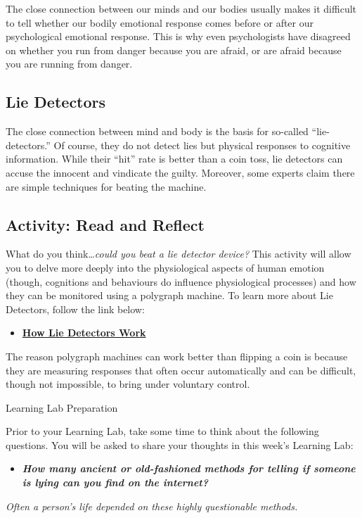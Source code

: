 \documentclass[
]{book}
\providecommand{\tightlist}{%
  \setlength{\itemsep}{0pt}\setlength{\parskip}{0pt}}
\begin{document}
The close connection between our minds and our bodies usually makes it difficult to tell whether our bodily emotional response comes before or after our psychological emotional response. This is why even psychologists have disagreed on whether you run from danger because you are afraid, or are afraid because you are running from danger.

\hypertarget{lie-detectors}{%
\subsection*{Lie Detectors}\label{lie-detectors}}

The close connection between mind and body is the basis for so-called ``lie-detectors.'' Of course, they do not detect lies but physical responses to cognitive information. While their ``hit'' rate is better than a coin toss, lie detectors can accuse the in­nocent and vindicate the guilty. Moreover, some experts claim there are simple techniques for beating the ma­chine.

\hypertarget{activity-read-and-reflect-11}{%
\subsection*{Activity: Read and Reflect}\label{activity-read-and-reflect-11}}

\begin{reflect}
What do you think\ldots{}\emph{could you beat a lie detector device?} This activity will allow you to delve more deeply into the physiological aspects of human emotion (though, cognitions and behaviours do influence physiological processes) and how they can be monitored using a polygraph machine. To learn more about Lie Detectors, follow the link below:

\begin{itemize}
\tightlist
\item
  \href{https://people.howstuffworks.com/lie-detector.htm}{\textbf{How Lie Detectors Work}}
\end{itemize}

The reason polygraph machines can work better than flipping a coin is because they are measuring responses that often occur automatically and can be difficult, though not impossible, to bring under voluntary control.

{Learning Lab Preparation}

Prior to your Learning Lab, take some time to think about the following questions. You will be asked to share your thoughts in this week's Learning Lab:

\begin{itemize}
\tightlist
\item
  \textbf{\emph{How many ancient or old-fashioned methods for telling if someone is lying can you find on the internet?}}
\end{itemize}

\emph{Often a person's life depended on these highly questionable methods.}
\end{reflect}
\end{document}
